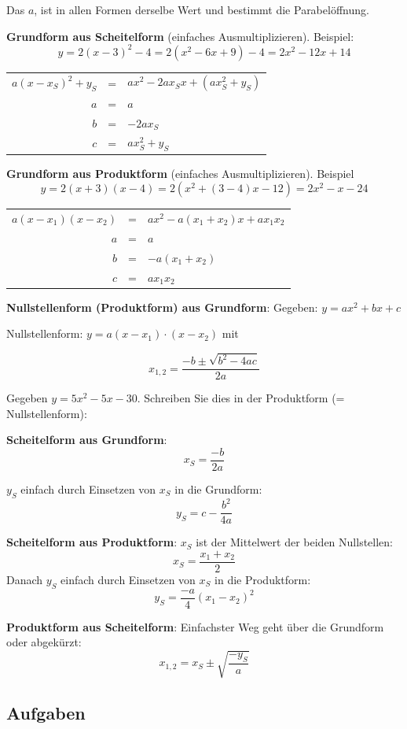 \begin{bemerkung}{}{}
  Das $a$,  ist in allen Formen derselbe Wert und bestimmt die Parabelöffnung.
  \end{bemerkung}
\newpage

\textbf{Grundform aus Scheitelform} (einfaches Ausmultiplizieren). Beispiel:
$$y=2(x-3)^2-4 = 2(x^2-6x+9)-4=2x^2-12x+14$$

\begin{tabular}{rcl}
$a(x-x_S)^2+y_S$ &=& $ax^2-2ax_Sx + (ax_S^2+y_S)$\\
  $a$ &=& $a$ \\
  $b$ &=& $-2ax_S$\\
  $c$ &=& $ax_S^2+y_S$
\end{tabular}


\textbf{Grundform aus Produktform} (einfaches Ausmultiplizieren). Beispiel
$$y=2(x+3)(x-4)=2(x^2 +(3-4)x - 12) = 2x^2-x-24$$

\begin{tabular}{rcl}
  $a(x-x_1)(x-x_2)$ &=& $ax^2 - a(x_1+x_2)x + ax_1x_2$\\
  $a$ &=& $a$ \\
  $b$ &=& $-a(x_1+x_2)$\\
  $c$ &=& $ax_1x_2$
\end{tabular}


\textbf{Nullstellenform (Produktform) aus Grundform}:
Gegeben: $y = ax^2 + bx + c$

Nullstellenform: $y = a(x-x_1)\cdot{}(x-x_2)$ mit

$$x_{1,2} = \frac{-b \pm \sqrt{b^2-4ac}}{2a}$$

\begin{beispiel}{}{}
Gegeben $y = 5x^2 - 5x - 30$. Schreiben Sie dies in der Produktform (=
Nullstellenform):
\end{beispiel}
\newpage


\textbf{Scheitelform aus Grundform}:
$$x_S=\frac{-b}{2a}$$

$y_S$ einfach durch Einsetzen von $x_S$ in die Grundform:
$$y_S=c-\frac{b^2}{4a}$$
 
\textbf{Scheitelform aus Produktform}: $x_S$ ist der Mittelwert der beiden
Nullstellen:
$$x_S=\frac{x_1+x_2}{2}$$
Danach $y_S$ einfach durch Einsetzen von $x_S$ in die Produktform:
$$y_S=\frac{-a}{4}(x_1-x_2)^2$$

\textbf{Produktform aus Scheitelform}: Einfachster Weg geht über die Grundform oder abgekürzt:
$$x_{1,2} =x_S \pm \sqrt{\frac{-y_S}{a}}$$


\subsection{Aufgaben}
